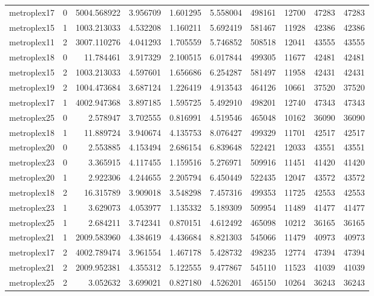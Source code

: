 \begin{longtable}{|l|r|r|r|r|r|r|r|r|r|}
metroplex17 & 0 & 5004.568922 & 3.956709 & 1.601295 & 5.558004 & 498161 & 12700 & 47283 & 47283 \\
metroplex15 & 1 & 1003.213033 & 4.532208 & 1.160211 & 5.692419 & 581467 & 11928 & 42386 & 42386 \\
metroplex11 & 2 & 3007.110276 & 4.041293 & 1.705559 & 5.746852 & 508518 & 12041 & 43555 & 43555 \\
metroplex18 & 0 & 11.784461 & 3.917329 & 2.100515 & 6.017844 & 499305 & 11677 & 42481 & 42481 \\
metroplex15 & 2 & 1003.213033 & 4.597601 & 1.656686 & 6.254287 & 581497 & 11958 & 42431 & 42431 \\
metroplex19 & 2 & 1004.473684 & 3.687124 & 1.226419 & 4.913543 & 464126 & 10661 & 37520 & 37520 \\
metroplex17 & 1 & 4002.947368 & 3.897185 & 1.595725 & 5.492910 & 498201 & 12740 & 47343 & 47343 \\
metroplex25 & 0 & 2.578947 & 3.702555 & 0.816991 & 4.519546 & 465048 & 10162 & 36090 & 36090 \\
metroplex18 & 1 & 11.889724 & 3.940674 & 4.135753 & 8.076427 & 499329 & 11701 & 42517 & 42517 \\
metroplex20 & 0 & 2.553885 & 4.153494 & 2.686154 & 6.839648 & 522421 & 12033 & 43551 & 43551 \\
metroplex23 & 0 & 3.365915 & 4.117455 & 1.159516 & 5.276971 & 509916 & 11451 & 41420 & 41420 \\
metroplex20 & 1 & 2.922306 & 4.244655 & 2.205794 & 6.450449 & 522435 & 12047 & 43572 & 43572 \\
metroplex18 & 2 & 16.315789 & 3.909018 & 3.548298 & 7.457316 & 499353 & 11725 & 42553 & 42553 \\
metroplex23 & 1 & 3.629073 & 4.053977 & 1.135332 & 5.189309 & 509954 & 11489 & 41477 & 41477 \\
metroplex25 & 1 & 2.684211 & 3.742341 & 0.870151 & 4.612492 & 465098 & 10212 & 36165 & 36165 \\
metroplex21 & 1 & 2009.583960 & 4.384619 & 4.436684 & 8.821303 & 545066 & 11479 & 40973 & 40973 \\
metroplex17 & 2 & 4002.789474 & 3.961554 & 1.467178 & 5.428732 & 498235 & 12774 & 47394 & 47394 \\
metroplex21 & 2 & 2009.952381 & 4.355312 & 5.122555 & 9.477867 & 545110 & 11523 & 41039 & 41039 \\
metroplex25 & 2 & 3.052632 & 3.699021 & 0.827180 & 4.526201 & 465150 & 10264 & 36243 & 36243 \\

\end{longtable}
